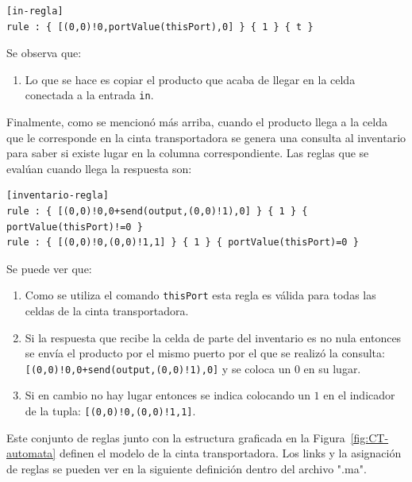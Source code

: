 \documentclass[10pt]{article}
\begin{document}
\begin{minipage}{1\textwidth}
	\centering
	\begin{lstlisting}
[in-regla]
rule : { [(0,0)!0,portValue(thisPort),0] } { 1 } { t }
	\end{lstlisting}
\end{minipage}

Se observa que:
\begin{enumerate}
\item Lo que se hace es copiar el producto que acaba de llegar en la celda conectada a la entrada \texttt{in}.
\end{enumerate}

Finalmente, como se mencionó más arriba, cuando el producto llega a la celda que le corresponde en la cinta transportadora se genera una consulta al inventario para saber si existe lugar en la columna correspondiente. Las reglas que se evalúan cuando llega la respuesta son:

\begin{minipage}{1\textwidth}
	\centering
	\begin{lstlisting}
[inventario-regla]
rule : { [(0,0)!0,0+send(output,(0,0)!1),0] } { 1 } { portValue(thisPort)!=0 }
rule : { [(0,0)!0,(0,0)!1,1] } { 1 } { portValue(thisPort)=0 }
	\end{lstlisting}
\end{minipage}

Se puede ver que:
\begin{enumerate}
 \item Como se utiliza el comando \texttt{thisPort} esta regla es válida para todas las celdas de la cinta transportadora. 
 \item Si la respuesta que recibe la celda de parte del inventario es no nula entonces se envía el producto por el mismo puerto por el que se realizó la consulta: \texttt{[(0,0)!0,0+send(output,(0,0)!1),0]} y se coloca un $0$ en su lugar.
 \item Si en cambio no hay lugar entonces se indica colocando un $1$ en el indicador de la tupla: \texttt{[(0,0)!0,(0,0)!1,1]}.
\end{enumerate}

Este conjunto de reglas junto con la estructura graficada en la Figura~\ref{fig:CT-automata} definen el modelo de la cinta transportadora. Los links y la asignación de reglas se pueden ver en la siguiente definición dentro del archivo ".ma".
\end{document}
